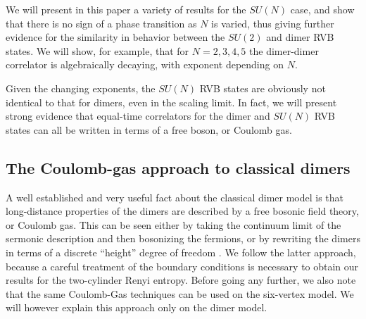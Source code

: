 \documentclass[11pt]{iopart}
\begin{document}
We will present in this paper a variety of results for the $SU(N)$ case, and show that there is no sign of a phase transition as $N$ is varied, thus giving further evidence for the similarity in behavior between the  $SU(2)$ and dimer RVB states. We will show, for example, that for $N=2,3,4,5$ the dimer-dimer correlator is algebraically decaying, with exponent depending on $N$.

Given the changing exponents, the $SU(N)$ RVB states are obviously not identical to that for dimers, even in the scaling limit. In fact, we will present strong evidence that equal-time correlators for the dimer and $SU(N)$ RVB states can all be written in terms of a free boson, or Coulomb gas. 

\subsection{The Coulomb-gas approach to classical dimers}
\label{sec:cg}

A well established and very useful fact about the classical dimer model is that long-distance properties of the dimers are described by a free bosonic field theory, or Coulomb gas. This can be seen either by taking the continuum limit of the sermonic description and then bosonizing the fermions, or by rewriting the dimers in terms of a discrete ``height'' degree of freedom \cite{Heights_1,Heights_2,Henley}. We follow the latter approach, because a careful treatment of the boundary conditions is necessary to obtain our results for the two-cylinder Renyi entropy. Before going any further, we also note that the same Coulomb-Gas techniques can be used on the six-vertex model. We will however explain this approach only on the dimer model. 
\end{document}
